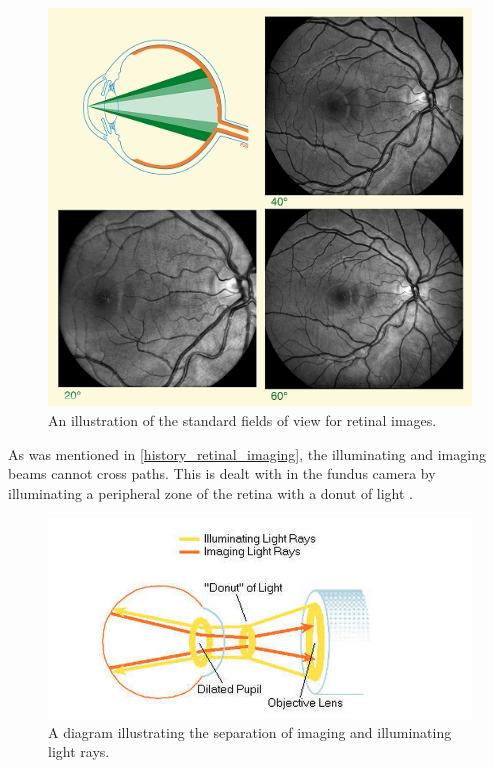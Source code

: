 \begin{figure}[H]
\centering
\includegraphics{figures/fieldofview}
\caption{An illustration of the standard fields of view for retinal images.\cite{saine2002ophthalmic}}
\label{fig:fov}
\end{figure}

As was mentioned in \cref{history_retinal_imaging}, the illuminating and imaging beams cannot cross paths. This is dealt with in the fundus camera by illuminating a peripheral zone of the retina with a donut of light . 

\begin{figure}[H]
\centering
\includegraphics{figures/lightdonut}
\caption{A diagram illustrating the separation of imaging and illuminating light rays.\cite{saine2002ophthalmic}}
\label{fig:ld}
\end{figure}


